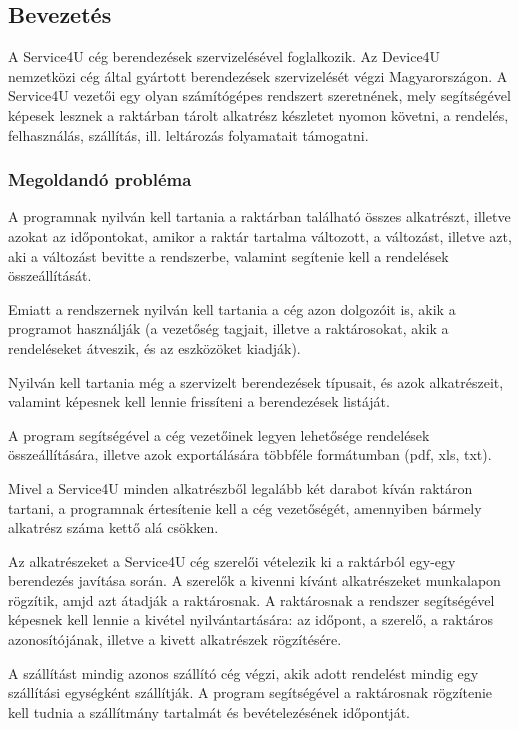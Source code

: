 \documentclass[12pt]{article}\usepackage[left=20mm,right=20mm,top=15mm,bottom=20mm]{geometry}
\begin{document}
\subsection{Bevezetés}
A Service4U cég berendezések szervizelésével foglalkozik. Az Device4U nemzetközi cég által
gyártott berendezések szervizelését végzi Magyarországon.
A Service4U vezetői egy olyan számítógépes rendszert szeretnének, mely segítségével képesek
lesznek a raktárban tárolt alkatrész készletet nyomon követni, a rendelés, felhasználás, szállítás, ill.
leltározás folyamatait támogatni.

\subsubsection{Megoldandó probléma}
A programnak nyilván kell tartania a raktárban található összes alkatrészt, illetve azokat az időpontokat, amikor a raktár tartalma változott, a változást, illetve azt, aki a változást bevitte a rendszerbe, valamint segítenie kell a rendelések összeállítását.

Emiatt a rendszernek nyilván kell tartania a cég azon dolgozóit is, akik a programot használják (a vezetőség tagjait, illetve a raktárosokat, akik a rendeléseket átveszik, és az eszközöket kiadják).

Nyilván kell tartania még a szervizelt berendezések típusait, és azok alkatrészeit, valamint képesnek kell lennie frissíteni a berendezések listáját.

A program segítségével a cég vezetőinek legyen lehetősége rendelések összeállítására, illetve azok exportálására többféle formátumban (pdf, xls, txt).
 
Mivel a Service4U minden alkatrészből legalább két darabot kíván raktáron tartani, a programnak értesítenie kell a cég vezetőségét, amennyiben bármely alkatrész száma kettő alá csökken.

Az alkatrészeket a Service4U cég szerelői vételezik ki a raktárból egy-egy berendezés javítása
során. 
A szerelők a kivenni kívánt alkatrészeket munkalapon rögzítik, amjd azt átadják a raktárosnak. 
A raktárosnak a rendszer segítségével képesnek kell lennie a kivétel nyilvántartására: az időpont, a szerelő, a raktáros azonosítójának, illetve a kivett alkatrészek rögzítésére.

A szállítást mindig azonos szállító cég végzi, akik adott rendelést mindig egy szállítási egységként szállítják.
A program segítségével a raktárosnak rögzítenie kell tudnia a szállítmány tartalmát és bevételezésének időpontját.
\end{document}
